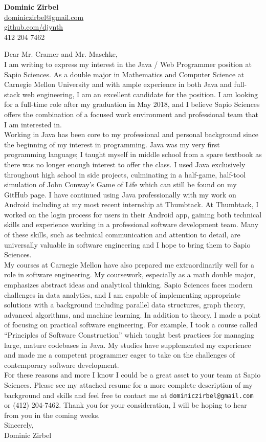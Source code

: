 \documentclass[letterpaper,10pt]{article}
\newcommand{\lb}{\vspace{14pt} \\}
\begin{document}
\thispagestyle{empty}

\begin{flushright}
    \textbf{\Large{Dominic Zirbel}} \\
    \href{mailto:dominiczirbel@gmail.com}{dominiczirbel@gmail.com} \\
    \href{https://github.com/djynth}{github.com/djynth} \\
    412 204 7462
\end{flushright}

\vspace{36pt}

Dear Mr. Cramer and Mr. Maschke,
\lb
I am writing to express my interest in the Java / Web Programmer position at Sapio Sciences. As a double major in Mathematics and Computer Science at Carnegie Mellon University and with ample experience in both Java and full-stack web engineering, I am an excellent candidate for the position. I am looking for a full-time role after my graduation in May 2018, and I believe Sapio Sciences offers the combination of a focused work environment and professional team that I am interested in.
\lb
Working in Java has been core to my professional and personal background since the beginning of my interest in programming. Java was my very first programming language; I taught myself in middle school from a spare textbook as there was no longer enough interest to offer the class. I used Java exclusively throughout high school in side projects, culminating in a half-game, half-tool simulation of John Conway's Game of Life which can still be found on my GitHub page. I have continued using Java professionally with my work on Android including at my most recent internship at Thumbtack. At Thumbtack, I worked on the login process for users in their Android app, gaining both technical skills and experience working in a professional software development team. Many of these skills, such as technical communication and attention to detail, are universally valuable in software engineering and I hope to bring them to Sapio Sciences.
\lb
My courses at Carnegie Mellon have also prepared me extraordinarily well for a role in software engineering. My coursework, especially as a math double major, emphasizes abstract ideas and analytical thinking. Sapio Sciences faces modern challenges in data analytics, and I am capable of implementing appropriate solutions with a background including parallel data structures, graph theory, advanced algorithms, and machine learning. In addition to theory, I made a point of focusing on practical software engineering. For example, I took a course called ``Principles of Software Construction'' which taught best practices for managing large, mature codebases in Java. My studies have supplemented my experience and made me a competent programmer eager to take on the challenges of contemporary software development.
\lb
For these reasons and more I know I could be a great asset to your team at Sapio Sciences. Please see my attached resume for a more complete description of my background and skills and feel free to contact me at \texttt{dominiczirbel@gmail.com} or (412) 204-7462. Thank you for your consideration, I will be hoping to hear from you in the coming weeks.
\lb
Sincerely, \\
Dominic Zirbel
\end{document}
